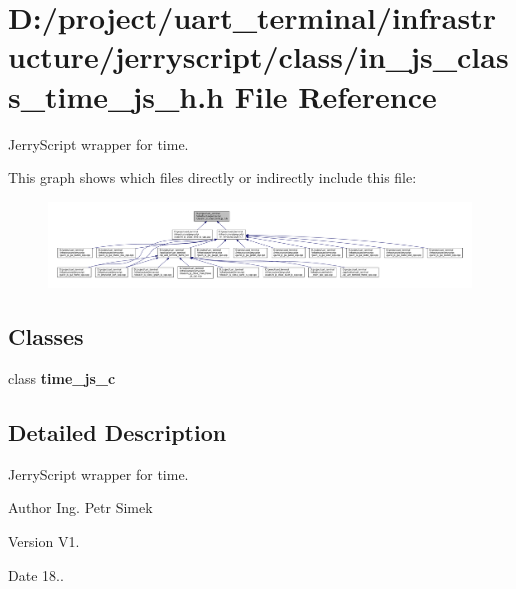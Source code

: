 \section{D\+:/project/uart\+\_\+terminal/infrastructure/jerryscript/class/in\+\_\+js\+\_\+class\+\_\+time\+\_\+js\+\_\+h.h File Reference}
\label{in__js__class__time__js__h_8h}


Jerry\+Script wrapper for time.  


This graph shows which files directly or indirectly include this file\+:
\nopagebreak
\begin{figure}[H]
\begin{center}
\leavevmode
\includegraphics[width=350pt]{in__js__class__time__js__h_8h__dep__incl}
\end{center}
\end{figure}
\subsection*{Classes}
\begin{DoxyCompactItemize}
\item 
class \textbf{ time\+\_\+js\+\_\+c}
\end{DoxyCompactItemize}


\subsection{Detailed Description}
Jerry\+Script wrapper for time. 

\begin{DoxyAuthor}{Author}
Ing. Petr Simek 
\end{DoxyAuthor}
\begin{DoxyVersion}{Version}
V1. 
\end{DoxyVersion}
\begin{DoxyDate}{Date}
18.. 
\end{DoxyDate}
